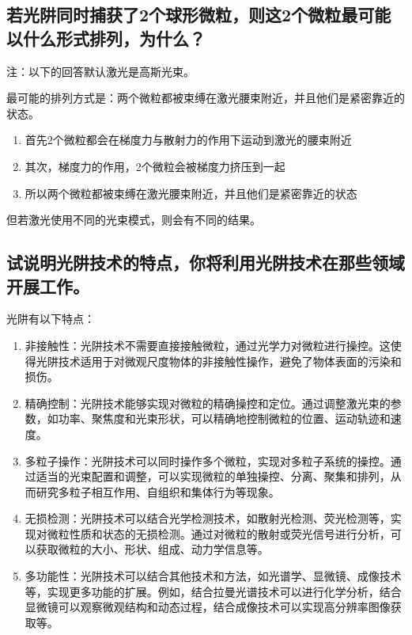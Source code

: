 \documentclass[a4paper,UTF8]{ctexart}
\begin{document}
\subsection{若光阱同时捕获了2个球形微粒，则这2个微粒最可能以什么形式排列，为什么？}

注：以下的回答默认激光是高斯光束。

最可能的排列方式是：两个微粒都被束缚在激光腰束附近，并且他们是紧密靠近的状态。

\begin{enumerate}
    \item 首先2个微粒都会在梯度力与散射力的作用下运动到激光的腰束附近
    \item 其次，梯度力的作用，2个微粒会被梯度力挤压到一起
    \item 所以两个微粒都被束缚在激光腰束附近，并且他们是紧密靠近的状态
\end{enumerate}

但若激光使用不同的光束模式，则会有不同的结果。

\subsection{试说明光阱技术的特点，你将利用光阱技术在那些领域开展工作。}

光阱有以下特点：

\begin{enumerate}
    \item 非接触性：光阱技术不需要直接接触微粒，通过光学力对微粒进行操控。这使得光阱技术适用于对微观尺度物体的非接触性操作，避免了物体表面的污染和损伤。
    \item 精确控制：光阱技术能够实现对微粒的精确操控和定位。通过调整激光束的参数，如功率、聚焦度和光束形状，可以精确地控制微粒的位置、运动轨迹和速度。
    \item 多粒子操作：光阱技术可以同时操作多个微粒，实现对多粒子系统的操控。通过适当的光束配置和调整，可以实现微粒的单独操控、分离、聚集和排列，从而研究多粒子相互作用、自组织和集体行为等现象。
    \item 无损检测：光阱技术可以结合光学检测技术，如散射光检测、荧光检测等，实现对微粒性质和状态的无损检测。通过对微粒的散射或荧光信号进行分析，可以获取微粒的大小、形状、组成、动力学信息等。
    \item 多功能性：光阱技术可以结合其他技术和方法，如光谱学、显微镜、成像技术等，实现更多功能的扩展。例如，结合拉曼光谱技术可以进行化学分析，结合显微镜可以观察微观结构和动态过程，结合成像技术可以实现高分辨率图像获取等。
\end{enumerate}
\end{document}
